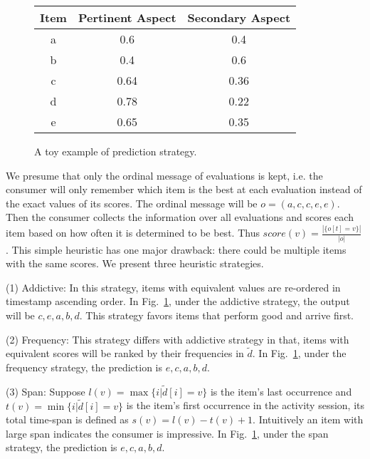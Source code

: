 \documentclass[sigconf]{acmart}
\begin{document}
\begin{figure}[htbp]
\begin{center}
\begin{tabular}{|c|c|c|}
\hline
Item & Pertinent Aspect & Secondary Aspect \\\hline
a & 0.6 & 0.4 \\
b & 0.4 & 0.6  \\
c & 0.64 & 0.36 \\
d & 0.78 & 0.22 \\
e & 0.65 & 0.35 \\\hline
\end{tabular}
\caption{A toy example of prediction strategy. }\label{fig:illustration}
\end{center}
\end{figure}


We presume that only the ordinal message of evaluations is kept, i.e. the consumer will only remember which item is the best at each evaluation instead of the exact values of its scores. The ordinal message will be $o=(a,c,c,e,e)$. Then the consumer collects the information over all evaluations and scores each item based on how often it is determined to be best. Thus $score(v)=\frac{|\{o[t] = v\}|}{|o|}$. This simple heuristic has one major drawback: there could be multiple items with the same scores. We present three heuristic strategies.



(1) Addictive: In this strategy,  items with equivalent values are re-ordered in timestamp ascending order. In Fig.~\ref{fig:illustration},  under the addictive strategy, the output will be $c,e,a,b,d$. This strategy favors items that perform good and arrive first.

(2) Frequency: This strategy differs with addictive strategy in that, items with equivalent scores will be ranked by their frequencies in $\tilde{d}$. In Fig.~\ref{fig:illustration},  under the frequency strategy, the prediction is $e,c,a,b,d$.

(3) Span: Suppose $l(v)=\max \{i|\tilde{d}[i]=v\}$ is the item's last occurrence and $t(v)=\min \{i|\tilde{d}[i]=v\} $ is the item's first occurrence in the activity session, its total time-span is defined as $s(v)=l(v)-t(v)+1$. Intuitively an item with large span indicates the  consumer is impressive. In Fig.~\ref{fig:illustration}, under the span strategy, the prediction is $e,c,a,b,d$.
\end{document}
